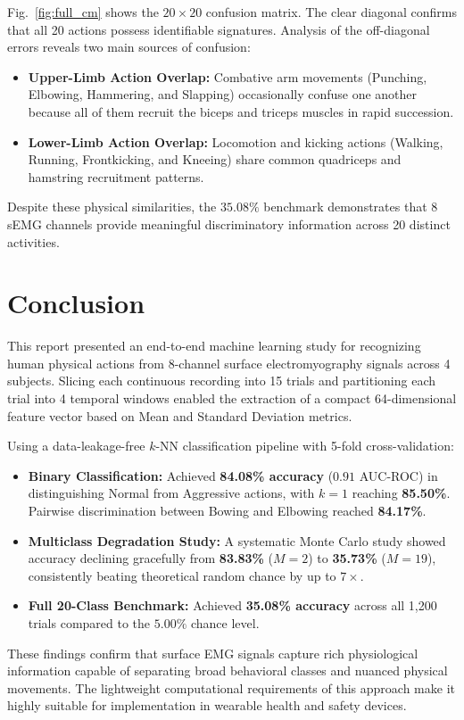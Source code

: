 \documentclass[journal]{IEEEtran}
\begin{document}
Fig.~\ref{fig:full_cm} shows the $20 \times 20$ confusion matrix. The clear diagonal confirms that all 20 actions possess identifiable signatures. Analysis of the off-diagonal errors reveals two main sources of confusion:
\begin{itemize}
    \item \textbf{Upper-Limb Action Overlap:} Combative arm movements (Punching, Elbowing, Hammering, and Slapping) occasionally confuse one another because all of them recruit the biceps and triceps muscles in rapid succession.
    \item \textbf{Lower-Limb Action Overlap:} Locomotion and kicking actions (Walking, Running, Frontkicking, and Kneeing) share common quadriceps and hamstring recruitment patterns.
\end{itemize}
Despite these physical similarities, the $35.08\%$ benchmark demonstrates that 8 sEMG channels provide meaningful discriminatory information across 20 distinct activities.

\section{Conclusion}
This report presented an end-to-end machine learning study for recognizing human physical actions from 8-channel surface electromyography signals across 4 subjects. Slicing each continuous recording into 15 trials and partitioning each trial into 4 temporal windows enabled the extraction of a compact 64-dimensional feature vector based on Mean and Standard Deviation metrics.

Using a data-leakage-free $k$-NN classification pipeline with 5-fold cross-validation:
\begin{itemize}
    \item \textbf{Binary Classification:} Achieved \textbf{84.08\% accuracy} ($0.91$ AUC-ROC) in distinguishing Normal from Aggressive actions, with $k=1$ reaching \textbf{85.50\%}. Pairwise discrimination between Bowing and Elbowing reached \textbf{84.17\%}.
    \item \textbf{Multiclass Degradation Study:} A systematic Monte Carlo study showed accuracy declining gracefully from \textbf{83.83\%} ($M=2$) to \textbf{35.73\%} ($M=19$), consistently beating theoretical random chance by up to $7\times$.
    \item \textbf{Full 20-Class Benchmark:} Achieved \textbf{35.08\% accuracy} across all 1,200 trials compared to the $5.00\%$ chance level.
\end{itemize}

These findings confirm that surface EMG signals capture rich physiological information capable of separating broad behavioral classes and nuanced physical movements. The lightweight computational requirements of this approach make it highly suitable for implementation in wearable health and safety devices.
\end{document}
